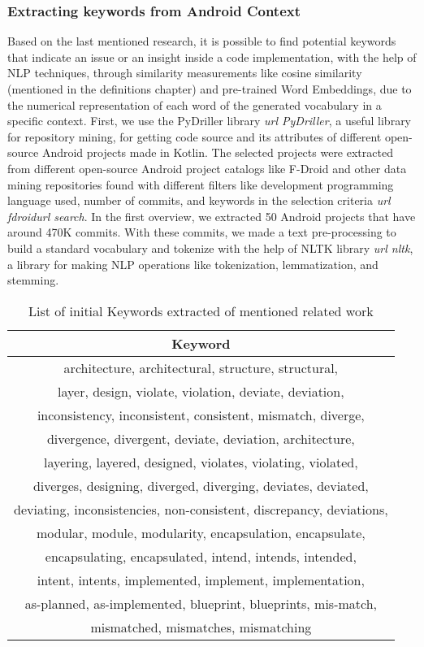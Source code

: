 \subsubsection{Extracting keywords from Android Context}
Based on the last mentioned research, it is possible to find potential keywords that indicate an issue or an insight inside a code implementation, with the help of NLP techniques, through similarity measurements like cosine similarity (mentioned in the definitions chapter) and pre-trained Word Embeddings, due to the numerical representation of each word of the generated vocabulary in a specific context. First, we use the PyDriller library \emph{url PyDriller}, a useful library for repository mining, for getting code source and its attributes of different open-source Android projects made in Kotlin. The selected projects were extracted from different open-source Android project catalogs like F-Droid and other data mining repositories found with different filters like development programming language used, number of commits, and keywords in the selection criteria \emph{url fdroid}\emph{url search}. In the first overview, we extracted 50 Android projects that have around 470K commits. With these commits, we made a text pre-processing to build a standard vocabulary and tokenize with the help of NLTK library \emph{url nltk}, a library for making NLP operations like tokenization, lemmatization, and stemming.

\begin{table}[H]
    \centering
    \begin{tabular}{|c|}
        \hline
        Keyword \\
        \hline
         architecture, architectural, structure, structural, \\
         layer, design, violate, violation, deviate, deviation,\\
         inconsistency, inconsistent, consistent, mismatch, diverge,\\
         divergence, divergent, deviate, deviation, architecture,\\
         layering, layered, designed, violates, violating, violated,\\
         diverges, designing, diverged, diverging, deviates, deviated, \\
         deviating, inconsistencies, non-consistent, discrepancy, deviations, \\
         modular, module, modularity, encapsulation, encapsulate, \\
         encapsulating, encapsulated, intend, intends, intended, \\
         intent, intents, implemented, implement, implementation,\\
         as-planned, as-implemented, blueprint, blueprints, mis-match,\\
         mismatched, mismatches, mismatching\\
         \hline
    \end{tabular}
    \caption{List of initial Keywords extracted of mentioned related work}
    \label{tab:my_label}
\end{table}

